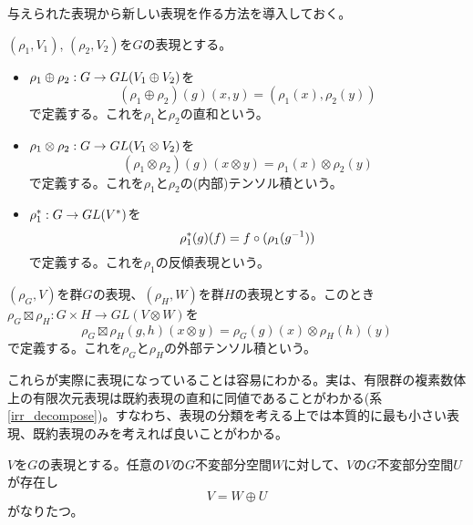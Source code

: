 \documentclass{ltjsreport}
\begin{document}
与えられた表現から新しい表現を作る方法を導入しておく。
\begin{defin}
  $(\rho_1,V_1)$, $(\rho_2,V_2)$を$G$の表現とする。
  \begin{itemize}
    \item $\rho_1\oplus\rho_2:G\rightarrow GL(V_1\oplus V_2)$を
    \[
    (\rho_1\oplus\rho_2)(g)(x,y)=(\rho_1(x),\rho_2(y))
    \]
    で定義する。これを$\rho_1$と$\rho_2$の直和という。

    \item $\rho_1\otimes\rho_2:G\rightarrow GL(V_1\otimes V_2)$を
    \[
    (\rho_1\otimes\rho_2)(g)(x\otimes y)=\rho_1(x)\otimes\rho_2(y)
    \]
    で定義する。これを$\rho_1$と$\rho_2$の(内部)テンソル積という。

    \item $\rho_1^*:G\rightarrow GL(V^*)$を
    \[
    \rho_1^*(g)(f)=f\circ (\rho_1(g^{-1}))
    \]
    で定義する。これを$\rho_1$の反傾表現という。
  \end{itemize}

  $(\rho_G,V)$を群$G$の表現、$(\rho_H,W)$を群$H$の表現とする。このとき$\rho_G\boxtimes\rho_H:G\times H\rightarrow GL(V\otimes W)$を
  \[
    \rho_G\boxtimes\rho_H(g,h)(x\otimes y)=\rho_G(g)(x)\otimes\rho_H(h)(y)
  \]
  で定義する。これを$\rho_G$と$\rho_H$の外部テンソル積という。
\end{defin}

  これらが実際に表現になっていることは容易にわかる。実は、有限群の複素数体上の有限次元表現は既約表現の直和に同値であることがわかる(系\ref{irr_decompose})。すなわち、表現の分類を考える上では本質的に最も小さい表現、既約表現のみを考えれば良いことがわかる。

  \begin{theo}[Maschkeの定理]\label{maschke}
    $V$を$G$の表現とする。任意の$V$の$G$不変部分空間$W$に対して、$V$の$G$不変部分空間$U$が存在し
    \[
    V= W\oplus U
    \]
    がなりたつ。
  \end{theo}
\end{document}
